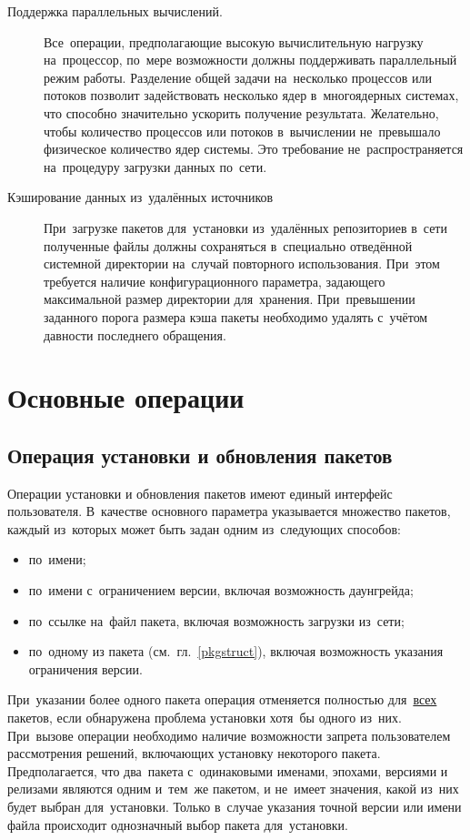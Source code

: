 \begin{description}
\item[Поддержка параллельных вычислений.]
Все~операции, предполагающие высокую вычислительную нагрузку на~процессор,
по~мере возможности должны поддерживать параллельный режим работы.
Разделение общей задачи на~несколько процессов или потоков позволит задействовать несколько ядер в~многоядерных системах,
что способно значительно ускорить получение результата. 
Желательно, чтобы количество процессов или потоков в~вычислении не~превышало физическое количество ядер системы.
Это требование не~распространяется на~процедуру загрузки данных по~сети.

\item[Кэширование данных из~удалённых источников]
При~загрузке пакетов для~установки из~удалённых репозиториев в~сети
полученные файлы должны сохраняться в~специально отведённой системной директории на~случай повторного использования.
При~этом требуется наличие конфигурационного параметра, задающего максимальной размер директории для~хранения.
При~превышении заданного порога размера кэша пакеты необходимо удалять с~учётом давности последнего обращения.

\end{description}

\section{Основные операции}
\subsection{Операция установки и обновления пакетов}

Операции установки и обновления пакетов имеют единый интерфейс пользователя.
В~качестве основного параметра указывается множество пакетов, каждый из~которых может быть  задан одним из~следующих способов:

\begin{itemize}
\item {по~имени;}
\item {по~имени с~ограничением версии, включая возможность даунгрейда;}
\item {по~ссылке на~файл пакета, включая возможность загрузки из~сети;}
\item{по~одному из  пакета (см.~гл.~\ref{pkgstruct}), включая возможность указания ограничения версии.}
\end{itemize}

При~указании более одного пакета операция отменяется полностью для~\underline{всех} пакетов, 
если обнаружена проблема установки хотя~бы одного из~них.
При~вызове операции необходимо наличие возможности запрета пользователем рассмотрения решений, 
включающих установку некоторого пакета. 
Предполагается, что два~пакета с~одинаковыми именами, эпохами, версиями и релизами являются одним и~тем~же пакетом,
и не~имеет значения, какой из~них будет выбран для~установки.
Только в~случае указания точной версии или имени файла происходит однозначный выбор пакета для~установки.

